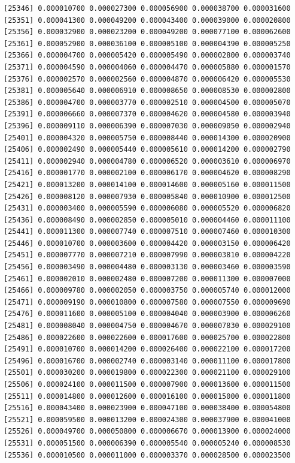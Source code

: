 \documentclass[]{article}
\begin{document}
\begin{verbatim}
[25346] 0.000010700 0.000027300 0.000056900 0.000038700 0.000031600
[25351] 0.000041300 0.000049200 0.000043400 0.000039000 0.000020800
[25356] 0.000032900 0.000023200 0.000049200 0.000077100 0.000062600
[25361] 0.000052900 0.000036100 0.000005100 0.000004390 0.000005250
[25366] 0.000004700 0.000005420 0.000005490 0.000002800 0.000003740
[25371] 0.000004590 0.000004060 0.000004470 0.000005880 0.000001570
[25376] 0.000002570 0.000002560 0.000004870 0.000006420 0.000005530
[25381] 0.000005640 0.000006910 0.000008650 0.000008530 0.000002800
[25386] 0.000004700 0.000003770 0.000002510 0.000004500 0.000005070
[25391] 0.000006660 0.000007370 0.000004620 0.000004580 0.000003940
[25396] 0.000009110 0.000006390 0.000007030 0.000009050 0.000002940
[25401] 0.000004320 0.000005750 0.000008440 0.000014300 0.000020900
[25406] 0.000002490 0.000005440 0.000005610 0.000014200 0.000002790
[25411] 0.000002940 0.000004780 0.000006520 0.000003610 0.000006970
[25416] 0.000001770 0.000002100 0.000006170 0.000004620 0.000008290
[25421] 0.000013200 0.000014100 0.000014600 0.000005160 0.000011500
[25426] 0.000008120 0.000007930 0.000005840 0.000010900 0.000012500
[25431] 0.000003400 0.000005590 0.000006080 0.000005520 0.000006820
[25436] 0.000008490 0.000002850 0.000005010 0.000004460 0.000011100
[25441] 0.000011300 0.000007740 0.000007510 0.000007460 0.000010300
[25446] 0.000010700 0.000003600 0.000004420 0.000003150 0.000006420
[25451] 0.000007770 0.000007210 0.000007990 0.000003810 0.000004220
[25456] 0.000003490 0.000004480 0.000003130 0.000003460 0.000003590
[25461] 0.000002010 0.000002480 0.000007200 0.000011300 0.000007000
[25466] 0.000009780 0.000002050 0.000003750 0.000005740 0.000012000
[25471] 0.000009190 0.000010800 0.000007580 0.000007550 0.000009690
[25476] 0.000011600 0.000005100 0.000004040 0.000003900 0.000006260
[25481] 0.000008040 0.000004750 0.000004670 0.000007830 0.000029100
[25486] 0.000022600 0.000022600 0.000017600 0.000025700 0.000022800
[25491] 0.000010700 0.000014200 0.000026400 0.000022100 0.000017200
[25496] 0.000016700 0.000002740 0.000003140 0.000011100 0.000017800
[25501] 0.000030200 0.000019800 0.000022300 0.000021100 0.000029100
[25506] 0.000024100 0.000011500 0.000007900 0.000013600 0.000011500
[25511] 0.000014800 0.000012600 0.000016100 0.000015000 0.000011800
[25516] 0.000043400 0.000023900 0.000047100 0.000038400 0.000054800
[25521] 0.000059500 0.000013200 0.000024300 0.000037900 0.000041000
[25526] 0.000049700 0.000050800 0.000006670 0.000013900 0.000024000
[25531] 0.000051500 0.000006390 0.000005540 0.000005240 0.000008530
[25536] 0.000010500 0.000011000 0.000003370 0.000028500 0.000023500

\end{verbatim}
\end{document}
